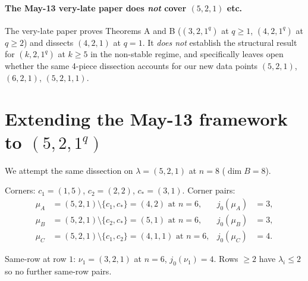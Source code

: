\documentclass[11pt]{article}
\theoremstyle{definition}
\begin{document}
\paragraph{The May-13 very-late paper does \emph{not} cover $(5, 2, 1)$ etc.}
The very-late paper proves Theorems A and B
($(3, 2, 1^q)$ at $q \ge 1$, $(4, 2, 1^q)$ at $q \ge 2$) and dissects
$(4, 2, 1)$ at $q = 1$.  It \emph{does not} establish the structural
result for $(k, 2, 1^q)$ at $k \ge 5$ in the non-stable regime, and
specifically leaves open whether the same 4-piece dissection accounts
for our new data points $(5, 2, 1)$, $(6, 2, 1)$, $(5, 2, 1, 1)$.

\section{Extending the May-13 framework to $(5, 2, 1^q)$}
\label{sec:521-extension}

We attempt the same dissection on $\lambda = (5, 2, 1)$ at $n = 8$
($\dim B = 8$).

Corners: $c_1 = (1, 5)$, $c_2 = (2, 2)$, $c_* = (3, 1)$.  Corner pairs:
\begin{align*}
   \mu_A &= (5, 2, 1) \setminus \{c_1, c_*\} = (4, 2) \text{ at } n = 6,
      & j_0(\mu_A) &= 3, \\
   \mu_B &= (5, 2, 1) \setminus \{c_2, c_*\} = (5, 1) \text{ at } n = 6,
      & j_0(\mu_B) &= 3, \\
   \mu_C &= (5, 2, 1) \setminus \{c_1, c_2\} = (4, 1, 1) \text{ at } n = 6,
      & j_0(\mu_C) &= 4.
\end{align*}

Same-row at row $1$: $\nu_1 = (3, 2, 1)$ at $n = 6$, $j_0(\nu_1) = 4$.
Rows $\ge 2$ have $\lambda_i \le 2$ so no further same-row pairs.
\end{document}
